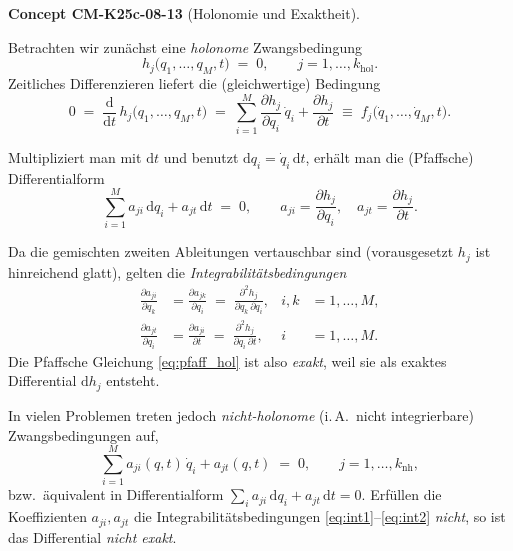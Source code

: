 \documentclass[10pt, letterpaper]{article}
\newcommand{\CustomHeading}[3]{%
  \par\medskip\noindent%
  \textbf{#1 #2} \textnormal{(#3)}.\enskip%
}
\newenvironment{CONC}[2]{\begin{unitbox}\CustomHeading{Concept}{#1}{#2}}{\end{unitbox}}
\begin{document}
\begin{CONC}{CM-K25c-08-13}{Holonomie und Exaktheit}
Betrachten wir zunächst eine \emph{holonome} Zwangsbedingung
\begin{equation}
  h_j\bigl(q_1,\dots,q_M,t\bigr)\;=\;0,
  \qquad j=1,\dots,k_{\mathrm{hol}} .
\end{equation}
Zeitliches Differenzieren liefert die (gleichwertige) Bedingung
\begin{equation}
  0 \;=\; \frac{\mathrm d}{\mathrm dt}\,
           h_j\bigl(q_1,\dots,q_M,t\bigr)
      \;=\;
      \sum_{i=1}^M 
        \frac{\partial h_j}{\partial q_i}\,\dot q_i
      + \frac{\partial h_j}{\partial t}
      \;\equiv\;
      f_j\bigl(\dot q_1,\dots,\dot q_M,t\bigr).
\end{equation}

Multipliziert man mit $\mathrm dt$ und benutzt
$\mathrm dq_i = \dot q_i\,\mathrm dt$, erhält man die (Pfaffsche) 
Differentialform
\begin{equation}\label{eq:pfaff_hol}
  \sum_{i=1}^{M} a_{ji}\,\mathrm dq_i
  + a_{jt}\,\mathrm dt \;=\; 0, \qquad
  a_{ji}=\frac{\partial h_j}{\partial q_i},\quad
  a_{jt}=\frac{\partial h_j}{\partial t}.
\end{equation}

Da die gemischten zweiten Ableitungen vertauschbar sind
(vorausgesetzt $h_j$ ist hinreichend glatt), gelten die
\emph{Integrabilitätsbedingungen}
\begin{align}
  \frac{\partial a_{ji}}{\partial q_k}
  &= \frac{\partial a_{jk}}{\partial q_i}
     \;=\;
     \frac{\partial^2 h_j}{\partial q_k\,\partial q_i},
     & i,k&=1,\dots,M,                                     \label{eq:int1}\\
  \frac{\partial a_{jt}}{\partial q_i}
  &= \frac{\partial a_{ji}}{\partial t}
     \;=\;
     \frac{\partial^2 h_j}{\partial q_i\,\partial t},
     & i&=1,\dots,M.                                       \label{eq:int2}
\end{align}
Die Pfaffsche Gleichung \eqref{eq:pfaff_hol} ist also \emph{exakt}, weil
sie als exaktes Differential $\mathrm d h_j$ entsteht.

In vielen Problemen treten jedoch \emph{nicht-holonome} (i.\,A.\, nicht
integrierbare) Zwangsbedingungen auf,
\begin{equation}\label{eq:pfaff_nh}
  \sum_{i=1}^{M} a_{ji}(q,t)\,\dot q_i
  + a_{jt}(q,t) \;=\; 0,
  \qquad j=1,\dots,k_{\mathrm{nh}},
\end{equation}
bzw.\ äquivalent in Differentialform
\(
  \sum_{i} a_{ji}\,\mathrm dq_i + a_{jt}\,\mathrm dt = 0 .
\)
Erfüllen die Koeffizienten $a_{ji},a_{jt}$ die
Integrabilitätsbedingungen \eqref{eq:int1}–\eqref{eq:int2} \emph{nicht},
so ist das Differential \emph{nicht exakt}.  


\end{CONC}
\end{document}
